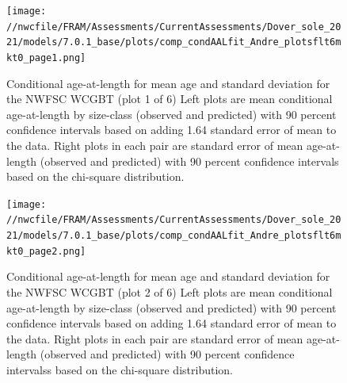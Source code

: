 \documentclass[11pt,
  english,
  a4paper,
]{article}
\begin{document}
\begin{figure}
\centering
\texttt{[image: //nwcfile/FRAM/Assessments/CurrentAssessments/Dover\_sole\_2021/models/7.0.1\_base/plots/comp\_condAALfit\_Andre\_plotsflt6mkt0\_page1.png]}
\caption{Conditional age-at-length for mean age and standard deviation for the NWFSC WCGBT (plot 1 of 6) Left plots are mean conditional age-at-length by size-class (observed and predicted) with 90 percent confidence intervals based on adding 1.64 standard error of mean to the data. Right plots in each pair are standard error of mean age-at-length (observed and predicted) with 90 percent confidence intervals based on the chi-square distribution.\label{fig:wcgbt-caal-fit-1}}
\end{figure}

\tagmcend\tagstructend


\begin{figure}
\centering
\texttt{[image: //nwcfile/FRAM/Assessments/CurrentAssessments/Dover\_sole\_2021/models/7.0.1\_base/plots/comp\_condAALfit\_Andre\_plotsflt6mkt0\_page2.png]}
\caption{Conditional age-at-length for mean age and standard deviation for the NWFSC WCGBT (plot 2 of 6) Left plots are mean conditional age-at-length by size-class (observed and predicted) with 90 percent confidence intervals based on adding 1.64 standard error of mean to the data. Right plots in each pair are standard error of mean age-at-length (observed and predicted) with 90 percent confidence intervalss based on the chi-square distribution.\label{fig:wcgbt-caal-fit-2}}
\end{figure}

\tagmcend\tagstructend

\end{document}
